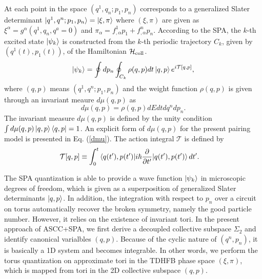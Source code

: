 \documentclass[%
superscriptaddress,
showpacs,
nofootinbib,
amsmath,amssymb,
aps,
prc,
twocolumn,
floatfix ]%
{revtex4-1}
\begin{document}
At each point in the space $(q^1,q_n; p_1,p_n)$ corresponds to
a generalized Slater determinant
$\ket{q^1,q^n;p_1,p_n}=\ket{\xi,\pi}$
where $(\xi,\pi)$ are given as
$\xi^\alpha=g^\alpha(q^1,q_n,q^a=0)$ and
$\pi_\alpha=f^1_{,\alpha}p_1+f^n_{,\alpha}p_n$.
According to the SPA, the $k$-th excited state $\ket{\psi_k}$
is constructed from the $k$-th periodic trajectory $C_k$,
given by $(q^1(t),p_1(t))$,
of the Hamiltonian $\mathcal{H}_{\rm coll}$.
\begin{equation}
\ket{\psi_k} = \oint dp_n \oint_{C_k} \rho(q,p) dt \ket{q,p}
	e^{i\mathcal{T}[q,p]} ,
	\label{SPA}
\end{equation}
where $(q,p)$ means $(q^1,q^n;p_1, p_n)$ and the weight function
$\rho(q,p)$ is given through an invariant meaure $d\mu(q,p)$ as
\begin{equation}
d\mu(q,p)=\rho(q,p) dE dt dq^n dp_n .
\end{equation}
The invariant measure $d\mu(q,p)$ is defined by the unity condition
$\int d\mu(q,p) \ket{q,p}\bra{q,p} = 1$.
An explicit form of $d\mu(q,p)$ for the present pairing model is presented
in Eq. (\ref{dmu}).
The action integral $\mathcal{T}$ is defined by
\begin{align}
\mathcal{T}[q,p] &\equiv
\int_{0}^{t} \braket{q(t'),p(t')| i\hbar\frac{\partial}{\partial t'}
	|q(t'),p(t')} dt' .
\label{tau}
\end{align}

The SPA quantization is able to provide a wave function $\ket{\psi_k}$
in microscopic degrees of freedom, which is given as a superposition
of generalized Slater determinants $\ket{q,p}$.
In addition, the integration with respect to $p_n$ over a circuit on torus
automatically recover the broken symmetry, namely the good particle number.
However, it relies on the existence of invariant tori.
In the present approach of ASCC+SPA,
we first derive a decoupled collective subspace $\Sigma_2$ and identify
canonical varialbles $(q,p)$.
Because of the cyclic nature of $(q^n,p_n)$, it is basically a 1D system
and becomes integrable.
In other words, we perform the torus quantization on
approximate tori in the TDHFB phase space $(\xi,\pi)$,
which is mapped from tori in the 2D collective subspace $(q,p)$.



\end{document}
